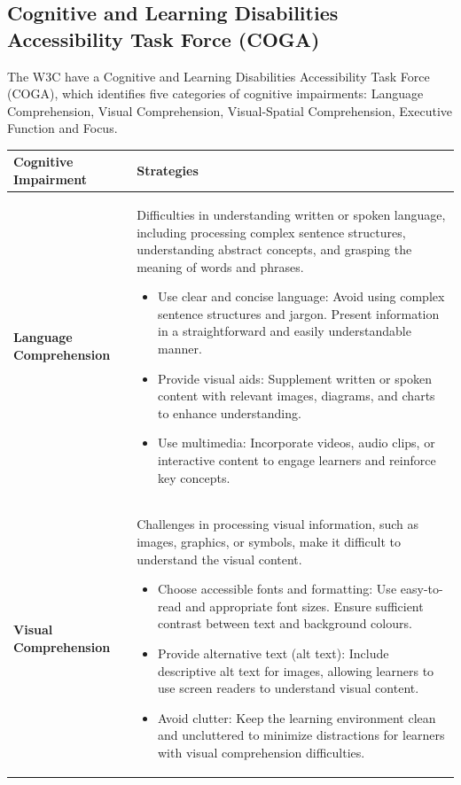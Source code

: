 \documentclass{article}
\begin{document}
\subsection{Cognitive and Learning Disabilities Accessibility Task Force (COGA)}


The W3C have a Cognitive and Learning Disabilities Accessibility Task Force (COGA), which identifies five categories of cognitive impairments:  Language Comprehension, Visual Comprehension, Visual-Spatial Comprehension, Executive Function and Focus.


\begin{longtable}{p{4cm}p{10cm}}
    \toprule
    \textbf{Cognitive Impairment} & \textbf{Strategies} \\
    \midrule
    \endfirsthead
 
    \endhead
    \textbf{Language Comprehension} & Difficulties in understanding written or spoken language, including processing complex sentence structures, understanding abstract concepts, and grasping the meaning of words and phrases.
    \begin{itemize}
        \item Use clear and concise language: Avoid using complex sentence structures and jargon. Present information in a straightforward and easily understandable manner.
        \item Provide visual aids: Supplement written or spoken content with relevant images, diagrams, and charts to enhance understanding.
        \item Use multimedia: Incorporate videos, audio clips, or interactive content to engage learners and reinforce key concepts.
    \end{itemize} \\
    \midrule
    \textbf{Visual Comprehension} & Challenges in processing visual information, such as images, graphics, or symbols, make it difficult to understand the visual content.
    \begin{itemize}
        \item Choose accessible fonts and formatting: Use easy-to-read and appropriate font sizes. Ensure sufficient contrast between text and background colours.
        \item Provide alternative text (alt text): Include descriptive alt text for images, allowing learners to use screen readers to understand visual content.
        \item Avoid clutter: Keep the learning environment clean and uncluttered to minimize distractions for learners with visual comprehension difficulties.

\end{itemize}
\end{longtable}
\end{document}
